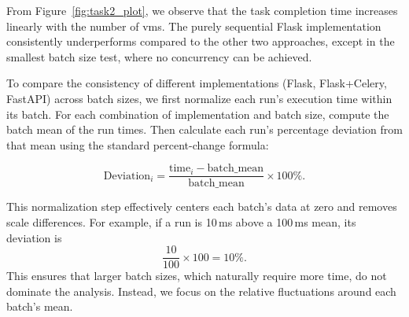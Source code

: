             From Figure~\ref{fig:task2_plot}, we observe that the task completion time increases linearly with the number of 
            \ac{vm}s. The purely sequential Flask implementation consistently underperforms compared to the other two approaches, 
            except in the smallest batch size test, where no concurrency can be achieved.

            To compare the consistency of different implementations (Flask, Flask+Celery, FastAPI) across batch sizes, we first 
            normalize each run's execution time within its batch. For each combination of implementation and batch size, compute 
            the batch mean of the run times. Then calculate each run's percentage deviation from that mean using the standard 
            percent-change formula:

            \[
            \text{Deviation}_i = \frac{\text{time}_i - \text{batch\_mean}}{\text{batch\_mean}} \times 100\%.
            \]

            This normalization step effectively centers each batch's data at zero and removes scale differences. For example, 
            if a run is 10\,ms above a 100\,ms mean, its deviation is 
            \[
            \frac{10}{100} \times 100 = 10\%.
            \]
            This ensures that larger batch sizes, which naturally require more time, do not dominate the analysis. Instead, we 
            focus on the relative fluctuations around each batch's mean.

